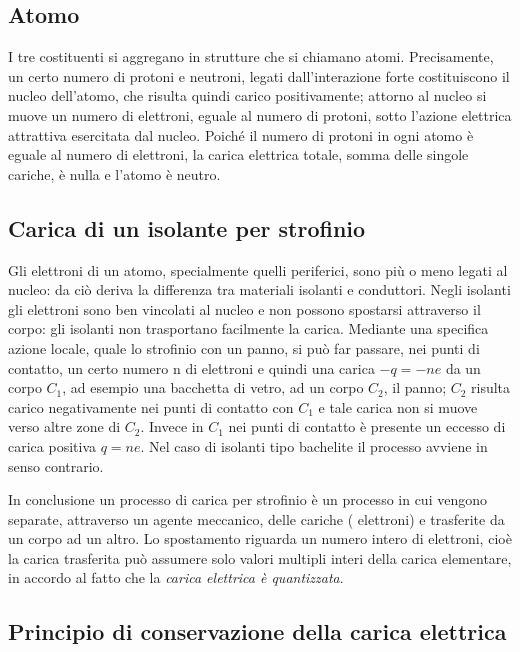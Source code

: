 \documentclass[class=book, crop=false, oneside, 12pt]{standalone}
\begin{document}
\subsection{Atomo}

I tre costituenti si aggregano in strutture che si chiamano atomi. 
Precisamente, un certo numero di protoni e neutroni, legati dall'interazione forte costituiscono il nucleo dell'atomo, che risulta quindi carico positivamente; attorno al nucleo si muove un numero di elettroni, eguale al numero di protoni, sotto l'azione elettrica attrattiva esercitata dal nucleo. 
Poiché il numero di protoni in ogni atomo è eguale al numero di elettroni, la carica elettrica totale, somma delle singole cariche, è nulla e l'atomo è neutro.

\subsection{Carica di un isolante per strofinio}

Gli elettroni di un atomo, specialmente quelli periferici, sono più o meno legati al nucleo: da ciò deriva la differenza tra materiali isolanti e conduttori. \newline
Negli isolanti gli elettroni sono ben vincolati al nucleo e non possono spostarsi attraverso il corpo: gli isolanti non trasportano facilmente la carica. \newline
Mediante una specifica azione locale, quale lo strofinio con un panno, si può far passare, nei punti di contatto, un certo numero n di elettroni e quindi una carica \(-q = -ne\) da un corpo \(C_1\), ad esempio una bacchetta di vetro, ad un corpo \(C_2\), il panno; 
\(C_2\) risulta carico negativamente nei punti di contatto con \(C_1\) e tale carica non si muove verso altre zone di \(C_2\). 
Invece in \(C_1\) nei punti di contatto è presente un eccesso di carica positiva \(q = ne\). \newline
Nel caso di isolanti tipo bachelite il processo avviene in senso contrario. 

In conclusione un processo di carica per strofinio è un processo in cui vengono separate, attraverso un agente meccanico, delle cariche ( elettroni) e trasferite da un corpo ad un altro. 
Lo spostamento riguarda un numero intero di elettroni, cioè la carica trasferita può assumere solo valori multipli interi della carica elementare, in accordo al fatto che la \emph{carica elettrica è quantizzata}.

\subsection{Principio di conservazione della carica elettrica}
\end{document}
